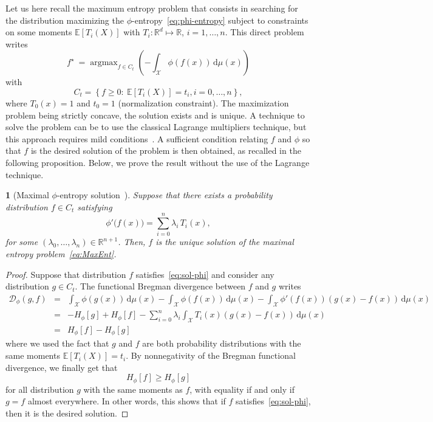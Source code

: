 \documentclass[english,sort&compress]{elsarticle}
\theoremstyle{definition}
\theoremstyle{plain}
\newtheorem{prop}{\protect\propositionname}
\theoremstyle{plain}
\providecommand{\propositionname}{Proposition}
\def\dmu{\mathrm{d}\mu}
\def\fD{\mathcal{D}}
\def\Rset{\mathbb{R}}
\def\X{\mathcal{X}}
\DeclareMathOperator*{\argmax}{\operatorname{argmax}}
\newcommand{\Esp}[1]{\mathbb{E}\left[ #1 \right]}
\begin{document}
Let us  here recall the maximum  entropy problem that consists  in searching for
the distribution maximizing the $\phi$-entropy~\eqref{eq:phi-entropy} subject to
constraints on  some moments $\Esp{T_i(X)}$  with $T_i: \Rset^d  \mapsto \Rset$,
$i=1,\ldots,n$. This direct problem writes
%
\begin{equation}\label{eq:MaxEnt}
\displaystyle f^\star \: = \argmax_{f \in C_t} \left( - \int_\X \phi(f(x))
\, \dmu(x) \right)
\end{equation}
%
with
%
\begin{equation}\label{eq:Ct}
C_t = \left\{ f \ge 0: \: \Esp{T_i(X)} = t_i, i=0,\ldots,n\right\},
\end{equation}
%
where $T_0(x) =  1$ and $t_0 = 1$ (normalization  constraint).  The maximization
problem being strictly concave, the solution  exists and is unique.  A technique
to solve the problem can be to use the classical Lagrange multipliers technique,
but   this  approach   requires  mild   conditions~\cite{KesKap89,  BorLew91:03,
  BorLew93, BenBor92, TebVaj93, Gir97}.  A sufficient condition relating $f$ and
$\phi$ so that $f$  is the desired solution of the problem  is then obtained, as
recalled in the  following proposition.  Below, we prove the  result without the
use of the Lagrange technique.

\begin{prop}[Maximal                                               $\phi$-entropy
    solution~\cite{KesKap89}]
  \label{prop:sol-phi}  Suppose  that  there  exists  a
  probability distribution $f \in C_t$ satisfying
  \begin{equation}\label{eq:sol-phi}
    \phi'\big(f(x)\big) = \sum_{i=0}^n \lambda_i \, T_i(x),
  \end{equation}
  for  some $(\lambda_0,\ldots,\lambda_n)  \in \Rset^{n+1}$.   Then, $f$  is the
  unique solution of the maximal entropy problem~\eqref{eq:MaxEnt}.
\end{prop}
%
\begin{proof}  Suppose that  distribution  $f$ satisfies~\eqref{eq:sol-phi}  and
  consider  any distribution  $g  \in C_t$.  The  functional Bregman  divergence
  between $f$ and $g$ writes
  \begin{eqnarray*}
  \fD_\phi(g,f) & = & \int_\X \phi(g(x)) \, \dmu(x) - \int_\X \phi(f(x)) \, \dmu(x) -
  \int_\X \phi'(f(x)) \left( g(x) - f(x) \right) \, \dmu(x)
  \\[2mm]
  & = & - H_\phi[g] + H_\phi[f] - \sum_{i=0}^n \lambda_i \int_\X T_i(x) 
\left( g(x) - f(x)  \right) \, \dmu(x) \\[2mm]
  & = & H_\phi[f] - H_\phi[g]
  \end{eqnarray*}
  where we  used the fact  that $g$ and  $f$ are both  probability distributions
  with the same  moments $\Esp{T_i(X)} = t_i$.  By  nonnegativity of the Bregman
  functional divergence, we finally get that
  \[
  H_\phi[f] \ge H_\phi[g]
  \]
  for all distribution $g$ with the  same moments as $f$, with equality if and
  only if  $g = f$ almost  everywhere.  In other  words, this shows that  if $f$
  satisfies~\eqref{eq:sol-phi}, then it is the desired solution.
\end{proof}
\end{document}
